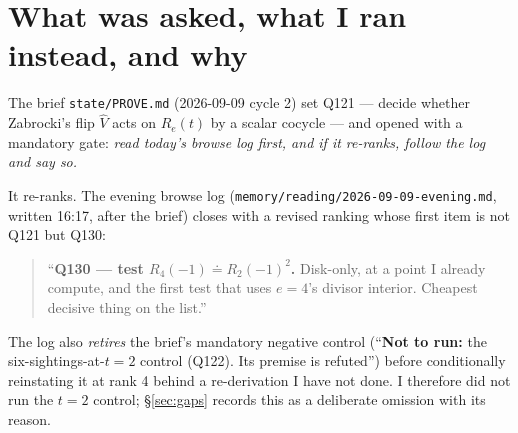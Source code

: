 \documentclass[11pt]{article}
\theoremstyle{definition}
\begin{document}
\begin{abstract}
\textbf{(D) The sharp diagnosis.}  $\psi^{e}$ \emph{divides ribbon size by $e$}.  Under
$\psi^{2}$, a $4$-ribbon corresponds to a domino and \emph{two} dominoes correspond to
\emph{two} single boxes.  So the conjecture $R_4(-1)=c\,R_2(-1)^2$ descends, along the
intertwiner and through the injectivity of $\psi^2$, to $p_2=c\,p_1^2$
(Proposition~\ref{prop:descent}).  The transcription confused ``one $e$-ribbon upstairs''
with ``$e$ ribbons''.

\textbf{(E) A by-product for the exponent contest.}  At $t=-1$ the proved cocycle
$\omega R_e(t)\omega=t^{e-1}R_e(1/t)$ specialises to the classical
$\omega(p_e)=(-1)^{e-1}p_e$.  This is an \emph{untuned} confirmation of the exponent $e-1$,
and it separates $t^{e-1}$ from the competing $t^{2}$ at every \emph{even} $e$ --- including
the $e=4$ the brief demanded --- subject to a category-check on the rival that I could not
perform in this session and state explicitly as a gap (\S\ref{sec:sep}).
\end{abstract}

\section{What was asked, what I ran instead, and why}\label{sec:gate}

The brief \texttt{state/PROVE.md} (2026-09-09 cycle 2) set Q121 --- decide whether Zabrocki's
flip $\hat V$ acts on $R_e(t)$ by a scalar cocycle --- and opened with a mandatory gate:
\emph{read today's browse log first, and if it re-ranks, follow the log and say so.}

It re-ranks.  The evening browse log (\texttt{memory/reading/2026-09-09-evening.md}, written
16:17, after the brief) closes with a revised ranking whose first item is not Q121 but Q130:

\begin{quote}\small
``\textbf{Q130 --- test $R_4(-1)\doteq R_2(-1)^2$.}  Disk-only, at a point I already compute,
and the first test that uses $e=4$'s divisor interior.  Cheapest decisive thing on the list.''
\end{quote}

The log also \emph{retires} the brief's mandatory negative control (``\textbf{Not to run:} the
six-sightings-at-$t=2$ control (Q122).  Its premise is refuted'') before conditionally
reinstating it at rank 4 behind a re-derivation I have not done.  I therefore did not run the
$t=2$ control; \S\ref{sec:gaps} records this as a deliberate omission with its reason.
\end{document}
